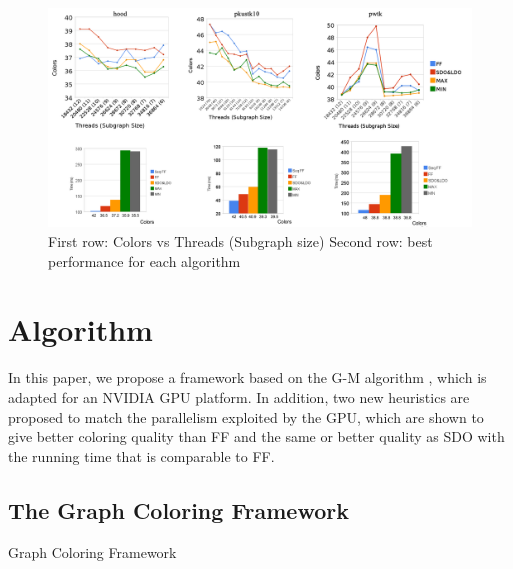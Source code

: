 \documentclass[preprint]{sigplanconf}
\newcommand{\gm}{G-M\xspace}
\begin{document}
\begin{figure}[t]
  \centering
  \includegraphics[scale=0.3]{figures/newPlot.png}
  \caption{ First row: Colors vs Threads (Subgraph size)  Second row: best performance for each algorithm}
  \label{fig:results}
\end{figure}


\section{Algorithm}

In this paper, we propose a framework based on the \gm algorithm \cite{gebremedhin2000scalable}, which is adapted for an NVIDIA GPU platform.  In addition, two new heuristics are proposed to match the parallelism exploited by the GPU, which are shown to give better coloring quality than FF and  the same or better quality as SDO with the running time that is comparable to FF. 

\subsection{The Graph Coloring Framework}

\renewcommand{\algorithmicrequire}{\textbf{Phase}}
\begin{algorithm}
\caption{Graph Coloring Framework \label{alg:framework}}
\begin{algorithmic}
\newline
	
		\newline
	\ENDWHILE
	

		
\end{algorithmic}
\end{algorithm}
\end{document}
